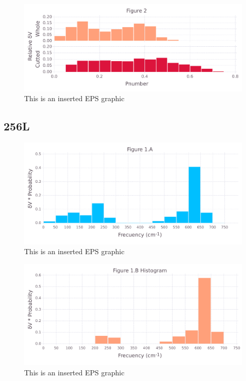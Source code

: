 \documentclass[10pt,letterpaper]{article}
\begin{document}
\begin{figure}[ht]
\begin{center}
\includegraphics[scale=0.5]{1prn/3both_figure_very_hi-precision.pdf}
\caption{This is an inserted EPS graphic}
\label{fig13}
\end{center}
\end{figure}

\FloatBarrier
\newpage

\subsection{256L}

\begin{figure}[ht]
\begin{center}
\includegraphics[scale=0.5]{256l/1afigure_very_hi-precision.pdf}
\caption{This is an inserted EPS graphic}
\label{fig1}
\end{center}
\end{figure}

\begin{figure}[ht]
\begin{center}
\includegraphics[scale=0.5]{256l/1bfigure_very_hi-precision.pdf}
\caption{This is an inserted EPS graphic}
\label{fig2}
\end{center}
\end{figure}
\end{document}
